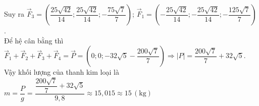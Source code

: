 \begin{ex}
{        Suy ra $\overrightarrow{F}_3 = \left(\dfrac{25\sqrt{42}}{14}; \dfrac{25\sqrt{42}}{14}; -\dfrac{75\sqrt{7}}{7}\right)$; $\overrightarrow{F}_1 = \left(-\dfrac{25\sqrt{42}}{14}; -\dfrac{25\sqrt{42}}{14}; -\dfrac{125\sqrt{7}}{7}\right)$.\\
        Để hệ cân bằng thì $\overrightarrow{F}_1+\overrightarrow{F}_2+\overrightarrow{F}_3+\overrightarrow{F}_4=\overrightarrow{P}=\left(0;0;-32\sqrt{5}-\dfrac{200\sqrt{7}}{7}\right) \Rightarrow \left|P\right|=\dfrac{200\sqrt{7}}{7}+32\sqrt{5}$.\\
        Vậy khối lượng của thanh kim loại là $m=\dfrac{P}{g}=\dfrac{\dfrac{200\sqrt{7}}{7}+32\sqrt{5}}{9,8} \approx 15{,}015 \approx 15 \, (\text{kg})$
    }
\end{ex}
